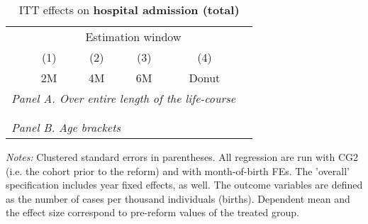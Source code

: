 \begin{table}[H] \centering 
 \begin{threeparttable} \centering \caption{ITT effects on \textbf{hospital admission (total)}}\label{tab: DD_hopsital2_total}
  {\def\sym#1{\ifmmode^{#1}\else\(^{#1}\)\fi} 
 	\begin{tabular}{l*{5}{c}}
 		\toprule 
 		& \multicolumn{4}{c}{Estimation window} \\ 
 		\cmidrule(lr){2-5}
 		&\multicolumn{1}{c}{(1)}&\multicolumn{1}{c}{(2)}&\multicolumn{1}{c}{(3)}&\multicolumn{1}{c}{(4)}\\
 		&\multicolumn{1}{c}{2M}&\multicolumn{1}{c}{4M}&\multicolumn{1}{c}{6M}&\multicolumn{1}{c}{Donut}\\
 		\midrule
 		\multicolumn{5}{l}{\emph{Panel A. Over entire length of the life-course}} \\
 		 \\ \\
 		\multicolumn{5}{l}{\emph{Panel B. Age brackets}} \\
 		    
 		\bottomrule 
 	\end{tabular}}
 	\begin{tablenotes} 
 		\item \scriptsize \emph{Notes:} Clustered standard errors in parentheses. All regression are run with CG2 (i.e. the cohort prior to the reform) and with month-of-birth FEs. The 'overall' specification includes year fixed effects, as well. The outcome variables are defined as the number of cases per thousand individuals (births). Dependent mean and the effect size correspond to pre-reform values of the treated group.
 	\end{tablenotes} 
 \end{threeparttable} 
 \end{table} 